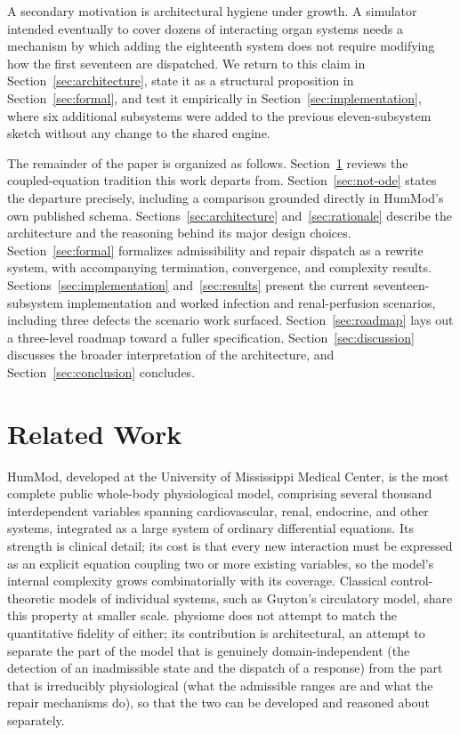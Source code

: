 \documentclass[11pt]{article}
\begin{document}
A secondary motivation is architectural hygiene under growth. A simulator intended eventually to cover dozens of interacting organ systems needs a mechanism by which adding the eighteenth system does not require modifying how the first seventeen are dispatched. We return to this claim in Section~\ref{sec:architecture}, state it as a structural proposition in Section~\ref{sec:formal}, and test it empirically in Section~\ref{sec:implementation}, where six additional subsystems were added to the previous eleven-subsystem sketch without any change to the shared engine.

The remainder of the paper is organized as follows. Section~\ref{sec:related} reviews the coupled-equation tradition this work departs from. Section~\ref{sec:not-ode} states the departure precisely, including a comparison grounded directly in HumMod's own published schema. Sections~\ref{sec:architecture} and~\ref{sec:rationale} describe the architecture and the reasoning behind its major design choices. Section~\ref{sec:formal} formalizes admissibility and repair dispatch as a rewrite system, with accompanying termination, convergence, and complexity results. Sections~\ref{sec:implementation} and~\ref{sec:results} present the current seventeen-subsystem implementation and worked infection and renal-perfusion scenarios, including three defects the scenario work surfaced. Section~\ref{sec:roadmap} lays out a three-level roadmap toward a fuller specification. Section~\ref{sec:discussion} discusses the broader interpretation of the architecture, and Section~\ref{sec:conclusion} concludes.

\section{Related Work}
\label{sec:related}

HumMod, developed at the University of Mississippi Medical Center, is the most complete public whole-body physiological model, comprising several thousand interdependent variables spanning cardiovascular, renal, endocrine, and other systems, integrated as a large system of ordinary differential equations. Its strength is clinical detail; its cost is that every new interaction must be expressed as an explicit equation coupling two or more existing variables, so the model's internal complexity grows combinatorially with its coverage. Classical control-theoretic models of individual systems, such as Guyton's circulatory model, share this property at smaller scale. physiome does not attempt to match the quantitative fidelity of either; its contribution is architectural, an attempt to separate the part of the model that is genuinely domain-independent (the detection of an inadmissible state and the dispatch of a response) from the part that is irreducibly physiological (what the admissible ranges are and what the repair mechanisms do), so that the two can be developed and reasoned about separately.
\end{document}
